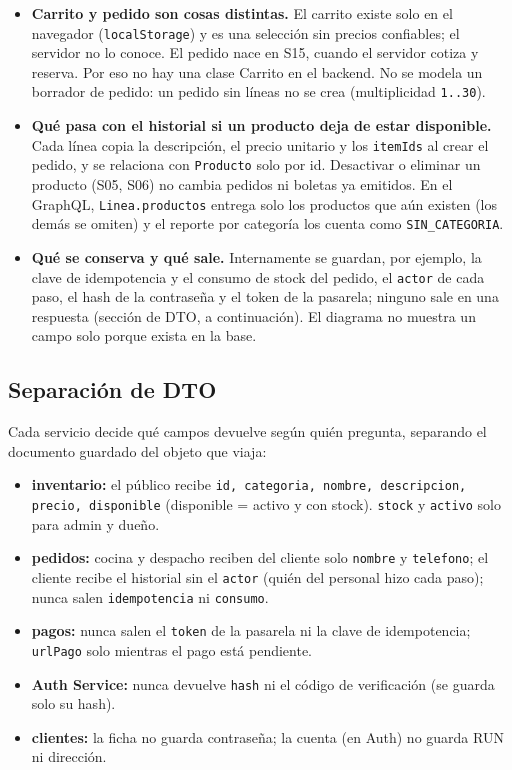 \begin{itemize}[nosep,leftmargin=*]
\item \textbf{Carrito y pedido son cosas distintas.} El carrito existe solo en el navegador (\texttt{localStorage}) y es una selección sin precios confiables; el servidor no lo conoce. El pedido nace en S15, cuando el servidor cotiza y reserva. Por eso no hay una clase Carrito en el backend. No se modela un borrador de pedido: un pedido sin líneas no se crea (multiplicidad \texttt{1.\allowbreak{}.\allowbreak{}30}).
\item \textbf{Qué pasa con el historial si un producto deja de estar disponible.} Cada línea copia la descripción, el precio unitario y los \texttt{itemIds} al crear el pedido, y se relaciona con \texttt{Producto} solo por id. Desactivar o eliminar un producto (S05, S06) no cambia pedidos ni boletas ya emitidos. En el GraphQL, \texttt{Linea.\allowbreak{}productos} entrega solo los productos que aún existen (los demás se omiten) y el reporte por categoría los cuenta como \texttt{SIN\_\allowbreak{}CATEGORIA}.
\item \textbf{Qué se conserva y qué sale.} Internamente se guardan, por ejemplo, la clave de idempotencia y el consumo de stock del pedido, el \texttt{actor} de cada paso, el hash de la contraseña y el token de la pasarela; ninguno sale en una respuesta (sección de DTO, a continuación). El diagrama no muestra un campo solo porque exista en la base.
\end{itemize}

\subsection{Separación de DTO}

Cada servicio decide qué campos devuelve según quién pregunta, separando el documento guardado del objeto que viaja:


\begin{itemize}[nosep,leftmargin=*]
\item \textbf{inventario:} el público recibe \texttt{id,\allowbreak{} categoria,\allowbreak{} nombre,\allowbreak{} descripcion,\allowbreak{} precio,\allowbreak{} disponible} (disponible = activo y con stock). \texttt{stock} y \texttt{activo} solo para admin y dueño.
\item \textbf{pedidos:} cocina y despacho reciben del cliente solo \texttt{nombre} y \texttt{telefono}; el cliente recibe el historial sin el \texttt{actor} (quién del personal hizo cada paso); nunca salen \texttt{idempotencia} ni \texttt{consumo}.
\item \textbf{pagos:} nunca salen el \texttt{token} de la pasarela ni la clave de idempotencia; \texttt{urlPago} solo mientras el pago está pendiente.
\item \textbf{Auth Service:} nunca devuelve \texttt{hash} ni el código de verificación (se guarda solo su hash).
\item \textbf{clientes:} la ficha no guarda contraseña; la cuenta (en Auth) no guarda RUN ni dirección.
\end{itemize}

